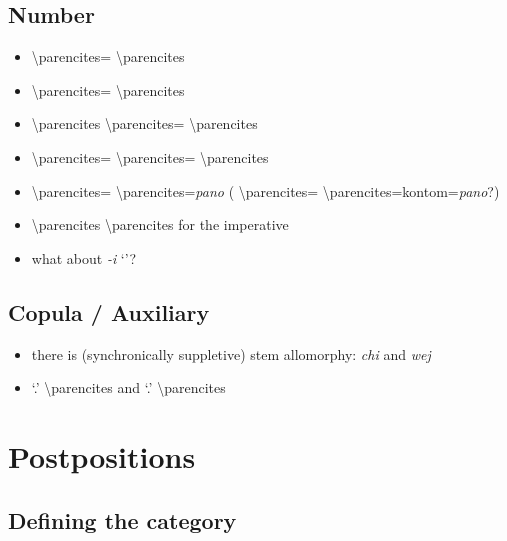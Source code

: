 \documentclass{memoir}
\begin{document}
\section{\texorpdfstring{Number \label{sec:verbalnumber}}{Number }}

\begin{itemize}
\tightlist
\item
   \textbackslash parencites=
  \textbackslash parencites
\item
   \textbackslash parencites=
  \textbackslash parencites
\item
   \textbackslash parencites
  \textbackslash parencites= \textbackslash parencites
\item
   \textbackslash parencites=
  \textbackslash parencites= \textbackslash parencites
\item
   \textbackslash parencites=
  \textbackslash parencites=\emph{pano} (
  \textbackslash parencites=
  \textbackslash parencites=kontom=\emph{pano}?)
\item
   \textbackslash parencites \textbackslash parencites
  for the imperative
\item
  what about \emph{-i} `'?
\end{itemize}

\section{Copula / Auxiliary}

\begin{itemize}
\tightlist
\item
  there is (synchronically suppletive) stem allomorphy: \emph{chi} and
  \emph{wej}
\item
   `.' \textbackslash parencites and
   `.' \textbackslash parencites
\end{itemize}

\chapter{\texorpdfstring{Postpositions \label{postp}}{Postpositions }}

\section{Defining the category}
\end{document}
